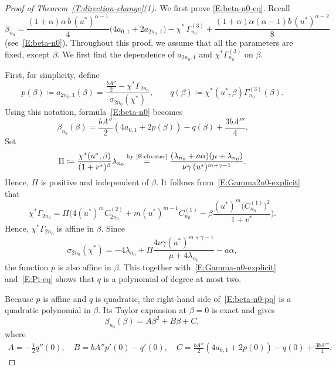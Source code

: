 \documentclass[11pt]{article} %
\theoremstyle{remark}
\theoremstyle{remark}
\numberwithin{equation}{section}
\numberwithin{figure}{section}
\numberwithin{table}{section}
\begin{document}
\begin{proof} [Proof of Theorem~\ref{T:direction-change}(1)]
  We first prove \eqref{E:beta-n0-eq}. Recall
  \[
    \beta_{n_0}
    = \frac{(1+\alpha)\alpha\,b\,(u^*)^{\alpha-1}}{4}
    \bigl(4a_{0,1} + 2a_{2n_0,1}\bigr)
    - \chi^*\,\Gamma_{n_0}^{(3)}
    + \frac{(1+\alpha)\alpha(\alpha-1)b\,(u^*)^{\alpha-2}}{8}
  \]
  (see~\eqref{E:beta-n0}). Throughout this proof, we assume that all the
  parameters are fixed, except $\beta$. We first find the dependence of
  $a_{2n_0,1}$ and $\chi^*\Gamma_{n_0}^{(3)}$ on $\beta$.

  First, for simplicity, define
  \[
    p(\beta)\coloneqq a_{2n_0,1}(\beta) =
    \frac{\frac{bA''}{2}-\chi^*\Gamma_{2n_0}}
    {\sigma_{2n_0}(\chi^*)},
    \qquad
    q(\beta)\coloneqq
    \chi^*(u^*,\beta)\Gamma_{n_0}^{(3)}(\beta).
  \]
  Using this notation, formula~\eqref{E:beta-n0} becomes
  \begin{equation}\label{E:beta-n0-pq}
    \beta_{n_0}(\beta)
    =
    \frac{bA''}{2}
    \left(
    4a_{0,1}+2p(\beta)
    \right)
    -q(\beta)
    +\frac{3bA'''}{4}.
  \end{equation}
  Set
  \begin{equation}\label{E:Pi-eq}
    \Pi
    \coloneqq
    \frac{\chi^*(u^*,\beta)}{(1+v^*)^\beta}\lambda_{n_0}
    \overset{\text{by~\eqref{E:chi-star}}}{=}
    \frac{(\lambda_{n_0}+a\alpha)(\mu+\lambda_{n_0})}{\nu\gamma\,(u^*)^{m+\gamma-1}}
    .
  \end{equation}
  Hence, $\Pi$ is positive and independent of $\beta$. It follows
  from~\eqref{E:Gamma2n0-explicit} that
  \[
    \chi^*\Gamma_{2n_0}
    =
    \Pi
    \Big(
    4(u^*)^mC_{2n_0}^{(2)}
    +m(u^*)^{m-1}C_{n_0}^{(1)}
    -\beta
    \frac{(u^*)^m\bigl(C_{n_0}^{(1)}\bigr)^2}{1+v^*}
    \Big).
  \]
  Hence, $\chi^*\Gamma_{2n_0}$ is affine in $\beta$. Since
  \[
    \sigma_{2n_0}(\chi^*)=-4\lambda_{n_0}+ \Pi \frac{4\nu \gamma
    (u^*)^{m+\gamma-1}}{\mu+4\lambda_{n_0}}-a\alpha,
  \]
  the function $p$ is also affine in $\beta$. This together
  with~\eqref{E:Gamma-n0-explicit} and~\eqref{E:Pi-eq} shows that $q$ is a
  polynomial of degree at most two.

  Because $p$ is affine and $q$ is quadratic,  the right-hand side
  of~\eqref{E:beta-n0-pq} is a quadratic polynomial in $\beta$. Its Taylor
  expansion at $\beta = 0$ is exact and gives
  \[
    \beta_{n_0}(\beta)=A\beta^2+B\beta+C,
  \]
  where
  \begin{align}\label{E:A-B-C-simple}
    A
    =-\frac12q''(0),
    \quad
    B
    =bA''p'(0)-q'(0),
    \quad
    C
    =
    \frac{bA''}{2}
    \left(
    4a_{0,1}+2p(0)
    \right)
    -q(0)
    +\frac{3bA'''}{4}.
  \end{align}


\end{proof}
\end{document}
